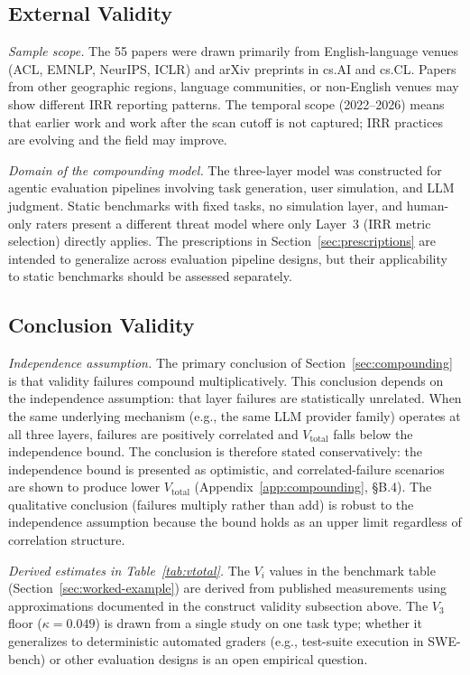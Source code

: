 \documentclass[preprint,12pt]{elsarticle}
\newcommand{\vtot}{V_{\text{total}}}
\begin{document}
\subsection{External Validity}
\label{sec:external-threats}

\textit{Sample scope.} The 55 papers were drawn primarily from English-language
venues (ACL, EMNLP, NeurIPS, ICLR) and arXiv preprints in cs.AI and cs.CL. Papers
from other geographic regions, language communities, or non-English venues may show
different IRR reporting patterns. The temporal scope (2022--2026) means that earlier
work and work after the scan cutoff is not captured; IRR practices are evolving and
the field may improve.

\textit{Domain of the compounding model.} The three-layer model was constructed for
agentic evaluation pipelines involving task generation, user simulation, and LLM
judgment. Static benchmarks with fixed tasks, no simulation layer, and human-only
raters present a different threat model where only Layer~3 (IRR metric selection)
directly applies. The prescriptions in Section~\ref{sec:prescriptions} are intended
to generalize across evaluation pipeline designs, but their applicability to static
benchmarks should be assessed separately.

\subsection{Conclusion Validity}
\label{sec:conclusion-threats}

\textit{Independence assumption.} The primary conclusion of Section~\ref{sec:compounding}
is that validity failures compound multiplicatively. This conclusion depends on the
independence assumption: that layer failures are statistically unrelated. When the
same underlying mechanism (e.g., the same LLM provider family) operates at all three
layers, failures are positively correlated and $\vtot$ falls below the independence
bound. The conclusion is therefore stated conservatively: the independence bound is
presented as optimistic, and correlated-failure scenarios are shown to produce lower
$\vtot$ (Appendix~\ref{app:compounding}, \S{}B.4). The qualitative conclusion
(failures multiply rather than add) is robust to the independence assumption because
the bound holds as an upper limit regardless of correlation structure.

\textit{Derived estimates in Table~\ref{tab:vtotal}.} The $V_i$ values in the
benchmark table (Section~\ref{sec:worked-example}) are derived from published
measurements using approximations documented in the construct validity subsection
above. The $V_3$ floor ($\kappa = 0.049$) is drawn from a single study
\citep{gurram2026} on one task type; whether it generalizes to deterministic
automated graders (e.g., test-suite execution in SWE-bench) or other evaluation
designs is an open empirical question.
\end{document}
